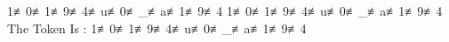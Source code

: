 1≢0≢1≢9≢4≢u≢0≢_≢a≢1≢9≢4
1≢0≢1≢9≢4≢u≢0≢_≢a≢1≢9≢4                                 
The Token Is : 1≢0≢1≢9≢4≢u≢0≢_≢a≢1≢9≢4
